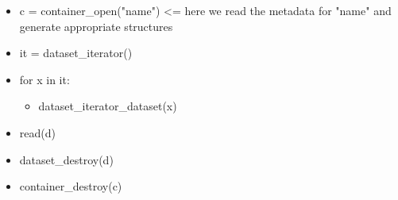 \begin{itemize}
  \item c = container\_open("name") \textless= here we read the metadata for "name" and generate appropriate structures
  \item it = dataset\_iterator()
  \item for x in it:
    \begin{itemize}
      \item dataset\_iterator\_dataset(x)
    \end{itemize}
  \item read(d)
  \item dataset\_destroy(d)
  \item container\_destroy(c)
\end{itemize}
